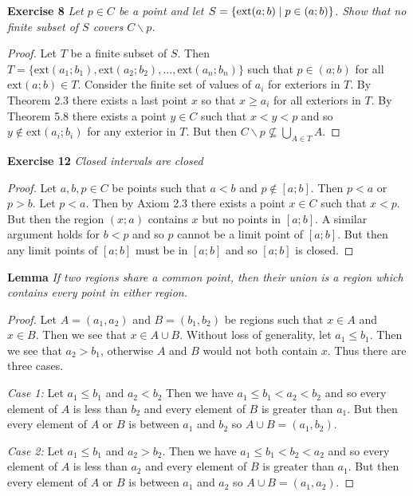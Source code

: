 \documentclass{article}
\begin{document}
\begin{flushleft}
\textbf{Exercise 8}
\textsl{Let $p \in C$ be a point and let $S=\{ \textup{ext}(a;b) \mid p \in (a;b) \}$. Show that no finite subset of $S$ covers $C \backslash p$.}
\begin{proof}
Let $T$ be a finite subset of $S$. Then $T=\{ \text{ext}(a_1;b_1), \text{ext}(a_2;b_2), \dots ,\text{ext}(a_n;b_n) \}$ such that $p \in (a;b)$ for all $\text{ext}(a;b) \in T$. Consider the finite set of values of $a_i$ for exteriors in $T$. By Theorem 2.3 there exists a last point $x$ so that $x \geq a_i$ for all exteriors in $T$. By Theorem 5.8 there exists a point $y \in C$ such that $x<y<p$ and so $y \notin \text{ext}(a_i;b_i)$ for any exterior in $T$. But then $C \backslash p \nsubseteq \bigcup_{A \in T} A$.
\end{proof}

\textbf{Exercise 12}
\textsl{Closed intervals are closed}
\begin{proof}
Let $a,b,p \in C$ be points such that $a<b$ and $p \notin [a;b]$. Then $p<a$ or $p>b$. Let $p<a$. Then by Axiom 2.3 there exists a point $x \in C$ such that $x<p$. But then the region $(x;a)$ contains $x$ but no points in $[a;b]$. A similar argument holds for $b<p$ and so $p$ cannot be a limit point of $[a;b]$. But then any limit points of $[a;b]$ must be in $[a;b]$ and so $[a;b]$ is closed.
\end{proof}

\textbf{Lemma}
\textsl{If two regions share a common point, then their union is a region which contains every point in either region.}
\begin{proof}
Let $A=(a_1,a_2)$ and $B=(b_1,b_2)$ be regions such that $x \in A$ and $x \in B$. Then we see that $x \in A \cup B$. Without loss of generality, let $a_1 \leq b_1$. Then we see that $a_2>b_1$, otherwise $A$ and $B$ would not both contain $x$. Thus there are three cases.\newline

\textsl{Case 1:} Let $a_1 \leq b_1$ and $a_2<b_2$ Then we have $a_1 \leq b_1<a_2<b_2$ and so every element of $A$ is less than $b_2$ and every element of $B$ is greater than $a_1$. But then every element of $A$ or $B$ is between $a_1$ and $b_2$ so $A \cup B = (a_1,b_2)$.\newline

\textsl{Case 2:} Let $a_1 \leq b_1$ and $a_2>b_2$. Then we have $a_1 \leq b_1<b_2<a_2$ and so every element of $A$ is less than $a_2$ and every element of $B$ is greater than $a_1$. But then every element of $A$ or $B$ is between $a_1$ and $a_2$ so $A \cup B = (a_1,a_2)$.\newline


\end{proof}
\end{flushleft}
\end{document}
